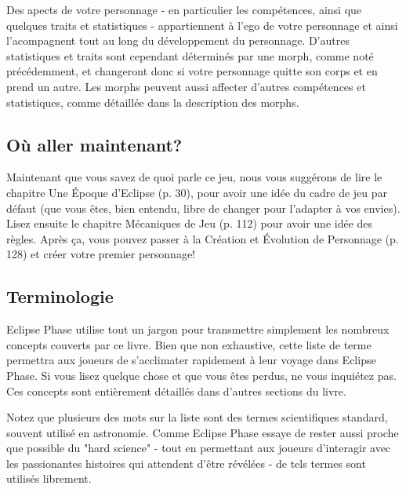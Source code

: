 Des apects de votre personnage - en particulier les compétences, ainsi que quelques traits et statistiques - appartiennent à l'ego de votre personnage et ainsi l'acompagnent tout au long du développement du personnage. D'autres statistiques et traits sont cependant déterminés par une morph, comme noté précédemment, et changeront donc si votre personnage quitte son corps et en prend un autre. Les morphs peuvent aussi affecter d'autres compétences et statistiques, comme détaillée dans la description des morphs. 



\subsection{Où aller maintenant?} \label{sec:where-go-from} 

Maintenant que vous savez de quoi parle ce jeu, nous vous suggérons de lire le chapitre Une Époque d'Eclipse (p. 30), pour avoir une idée du cadre de jeu par défaut (que vous êtes, bien entendu, libre de changer pour  l'adapter à vos envies). Lisez ensuite le chapitre Mécaniques de Jeu (p. 112) pour avoir une idée des règles. Après ça, vous pouvez passer à la Création et Évolution de Personnage (p. 128) et créer votre premier personnage! 



\subsection{Terminologie} \label{sec:terminology} 

Eclipse Phase utilise tout un jargon pour transmettre simplement les nombreux concepts couverts par ce livre. Bien que non exhaustive, cette liste de terme permettra aux joueurs de s'acclimater rapidement à leur voyage dans Eclipse Phase. Si vous lisez quelque chose et que vous êtes perdus, ne vous inquiétez pas. Ces concepts sont entièrement détaillés dans d'autres sections du livre. 

Notez que plusieurs des mots sur la liste sont des termes scientifiques standard, souvent utilisé en astronomie. Comme Eclipse Phase essaye de rester aussi proche que possible du "hard science" - tout en permettant aux joueurs d'interagir avec les passionantes histoires qui attendent d'être révélées - de tels termes sont utilisés librement. 

